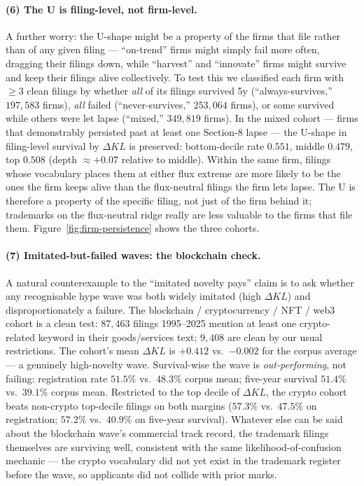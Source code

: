 \documentclass[11pt]{article}
\begin{document}
\paragraph{(6) The U is filing-level, not firm-level.}
A further worry: the U-shape might be a property of the firms that
file rather than of any given filing --- ``on-trend'' firms might
simply fail more often, dragging their filings down, while
``harvest'' and ``innovate'' firms might survive and keep their
filings alive collectively. To test this we classified each firm
with $\geq 3$ clean filings by whether \emph{all} of its filings
survived 5y (``always-survives,'' $197{,}583$ firms), \emph{all}
failed (``never-survives,'' $253{,}064$ firms), or some survived
while others were let lapse (``mixed,'' $349{,}819$ firms). In the
mixed cohort --- firms that demonstrably persisted past at least
one Section-8 lapse --- the U-shape in filing-level survival by
$\Delta KL$ is preserved: bottom-decile rate $0.551$, middle
$0.479$, top $0.508$ (depth $\approx +0.07$ relative to middle).
Within the same firm, filings whose vocabulary places them at
either flux extreme are more likely to be the ones the firm keeps
alive than the flux-neutral filings the firm lets lapse. The U is
therefore a property of the specific filing, not just of the firm
behind it; trademarks on the flux-neutral ridge really are less
valuable to the firms that file them.
Figure~\ref{fig:firm-persistence} shows the three cohorts.

\paragraph{(7) Imitated-but-failed waves: the blockchain check.}
A natural counterexample to the ``imitated novelty pays'' claim is
to ask whether any recognisable hype wave was both widely imitated
(high $\Delta KL$) and disproportionately a failure. The
blockchain / cryptocurrency / NFT / web3 cohort is a clean test:
$87{,}463$ filings 1995--2025 mention at least one crypto-related
keyword in their goods/services text; $9{,}408$ are clean by our
usual restrictions. The cohort's mean $\Delta KL$ is $+0.412$ vs.\
$-0.002$ for the corpus average --- a genuinely high-novelty wave.
Survival-wise the wave is \emph{out-performing}, not failing:
registration rate $51.5\%$ vs.\ $48.3\%$ corpus mean; five-year
survival $51.4\%$ vs.\ $39.1\%$ corpus mean. Restricted to the top
decile of $\Delta KL$, the crypto cohort beats non-crypto top-decile
filings on both margins ($57.3\%$ vs.\ $47.5\%$ on registration;
$57.2\%$ vs.\ $40.9\%$ on five-year survival). Whatever else can
be said about the blockchain wave's commercial track record, the
trademark filings themselves are surviving well, consistent with
the same likelihood-of-confusion mechanic --- the crypto vocabulary
did not yet exist in the trademark register before the wave, so
applicants did not collide with prior marks.
\end{document}
